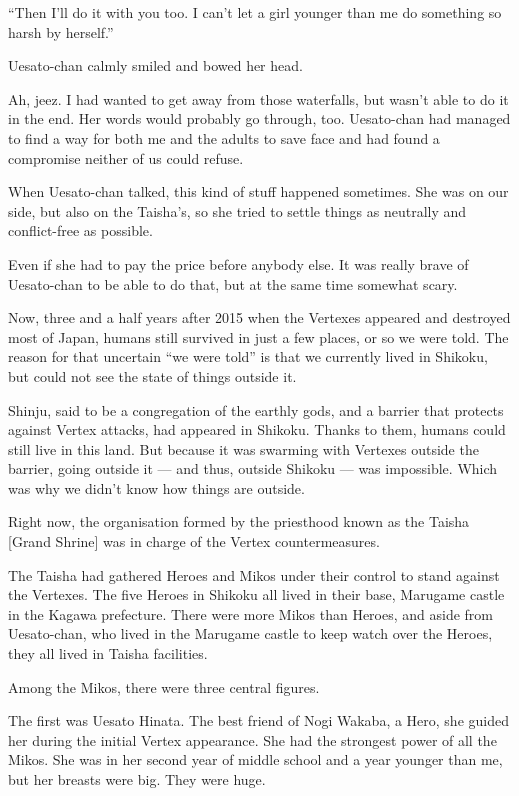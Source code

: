 ``Then I'll do it with you too. I can't let a girl younger than me do something so harsh by herself.''

Uesato-chan calmly smiled and bowed her head.

Ah, jeez. I had wanted to get away from those waterfalls, but wasn't able to do it in the end. Her words would probably go through, too. Uesato-chan had managed to find a way for both me and the adults to save face and had found a compromise neither of us could refuse.

When Uesato-chan talked, this kind of stuff happened sometimes. She was on our side, but also on the Taisha's, so she tried to settle things as neutrally and conflict-free as possible.

Even if she had to pay the price before anybody else. It was really brave of Uesato-chan to be able to do that, but at the same time somewhat scary.

Now, three and a half years after 2015 when the Vertexes appeared and destroyed most of Japan, humans still survived in just a few places, or so we were told. The reason for that uncertain ``we were told'' is that we currently lived in Shikoku, but could not see the state of things outside it.

Shinju, said to be a congregation of the earthly gods, and a barrier that protects against Vertex attacks, had appeared in Shikoku. Thanks to them, humans could still live in this land. But because it was swarming with Vertexes outside the barrier, going outside it --- and thus, outside Shikoku --- was impossible. Which was why we didn't know how things are outside.

Right now, the organisation formed by the priesthood known as the Taisha [Grand Shrine] was in charge of the Vertex countermeasures.

The Taisha had gathered Heroes and Mikos under their control to stand against the Vertexes. The five Heroes in Shikoku all lived in their base, Marugame castle in the Kagawa prefecture. There were more Mikos than Heroes, and aside from Uesato-chan, who lived in the Marugame castle to keep watch over the Heroes, they all lived in Taisha facilities.

Among the Mikos, there were three central figures.

The first was Uesato Hinata. The best friend of Nogi Wakaba, a Hero, she guided her during the initial Vertex appearance. She had the strongest power of all the Mikos. She was in her second year of middle school and a year younger than me, but her breasts were big. They were huge.

